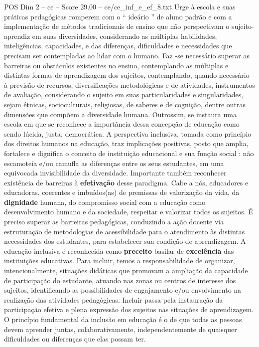 \begin{textsample}{POS Dim 2 – ce – Score 29.00 – ce/ce\_inf\_e\_ef\_8.txt}
Urge à escola e suas práticas pedagógicas romperem com o “ ideário ” de aluno padrão e com a implementação de métodos tradicionais de ensino que não perspectivam o sujeito-aprendiz em suas diversidades, considerando as múltiplas habilidades, inteligências, capacidades, e das diferenças, dificuldades e necessidades que precisam ser contempladas ao lidar com o humano.
Faz -se necessário superar as barreiras ou obstáculos existentes no ensino, contemplando as múltiplas e distintas formas de aprendizagem dos sujeitos, contemplando, quando necessário à previsão de recursos, diversificações metodológicas e de atividades, instrumentos de avaliação, considerando o sujeito em suas particularidades e singularidades, sejam étnicas, socioculturais, religiosas, de saberes e de cognição, dentre outras dimensões que compõem a diversidade humana.
Outrossim, se instaura uma escola em que se reconhece a importância dessa concepção de educação como sendo lúcida, justa, democrática.
A perspectiva inclusiva, tomada como princípio dos direitos humanos na educação, traz implicações positivas, posto que amplia, fortalece e dignifica o conceito de instituição educacional e sua função social : não escamoteia e/ou camufla as diferenças entre os seus estudantes, em uma equivocada invisibilidade da diversidade.
Importante também reconhecer existência de barreiras à \textbf{efetivação} desse paradigma.
Cabe a nós, educadores e educadoras, coerentes e imbuídos(as) de premissas de valorização da vida, da \textbf{dignidade} humana, do compromisso social com a educação como desenvolvimento humano e da sociedade, respeitar e valorizar todos os sujeitos.
É preciso superar as barreiras pedagógicas, conduzindo a ação docente via estruturação de metodologias de acessibilidade para o atendimento às distintas necessidades dos estudantes, para estabelecer sua condição de aprendizagem.
A educação inclusiva é reconhecida como \textbf{preceito} basilar de \textbf{excelência} das instituições educativas.
Para incluir, temos a responsabilidade de organizar, intencionalmente, situações didáticas que promovam a ampliação da capacidade de participação do estudante, atuando nas zonas ou centros de interesse dos sujeitos, identificando as possibilidades de engajamento e/ou envolvimento na realização das atividades pedagógicas.
Incluir passa pela instauração da participação efetiva e plena expressão dos sujeitos nas situações de aprendizagem.
O princípio fundamental da inclusão em educação é o de que todas as pessoas devem aprender juntas, colaborativamente, independentemente de quaisquer dificuldades ou diferenças que elas possam ter.

\end{textsample}
